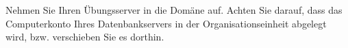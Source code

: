 \item Nehmen Sie Ihren Übungsserver in die Domäne
 auf. Achten Sie darauf, dass das
Computerkonto Ihres Datenbankservers in der 
Organisationseinheit  abgelegt wird, bzw. verschieben Sie es dorthin.
